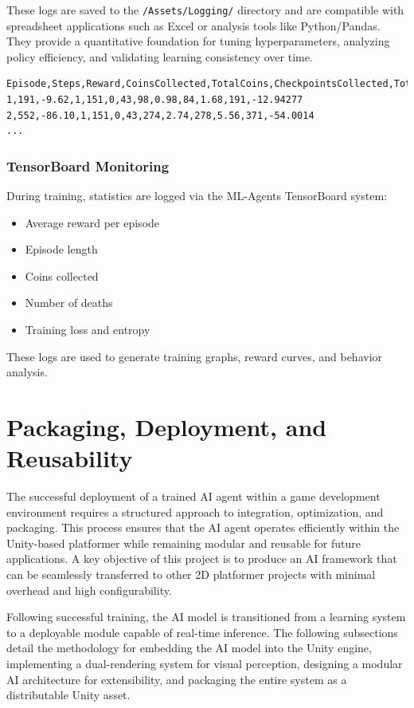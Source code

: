 \documentclass[12pt,oneside,openright,a4paper]{cpe-english-project}
\begin{document}
These logs are saved to the \texttt{/Assets/Logging/} directory and are compatible with spreadsheet applications such as Excel or analysis tools like Python/Pandas. They provide a quantitative foundation for tuning hyperparameters, analyzing policy efficiency, and validating learning consistency over time.

\begin{lstlisting}
Episode,Steps,Reward,CoinsCollected,TotalCoins,CheckpointsCollected,TotalCheckpoints,JumpCount,JumpPenalty,DashCount,DashPenalty,CumulativeAvgSteps,CumulativeAvgRewards
1,191,-9.62,1,151,0,43,98,0.98,84,1.68,191,-12.94277
2,552,-86.10,1,151,0,43,274,2.74,278,5.56,371,-54.0014
...
\end{lstlisting}

\subsubsection{TensorBoard Monitoring}

During training, statistics are logged via the ML-Agents TensorBoard system:

\begin{itemize}
\item Average reward per episode
\item Episode length
\item Coins collected
\item Number of deaths
\item Training loss and entropy
\end{itemize}

These logs are used to generate training graphs, reward curves, and behavior analysis.

\section{Packaging, Deployment, and Reusability}
The successful deployment of a trained AI agent within a game development environment requires a structured approach to integration, optimization, and packaging. This process ensures that the AI agent operates efficiently within the Unity-based platformer while remaining modular and reusable for future applications. A key objective of this project is to produce an AI framework that can be seamlessly transferred to other 2D platformer projects with minimal overhead and high configurability.\par

Following successful training, the AI model is transitioned from a learning system to a deployable module capable of real-time inference. The following subsections detail the methodology for embedding the AI model into the Unity engine, implementing a dual-rendering system for visual perception, designing a modular AI architecture for extensibility, and packaging the entire system as a distributable Unity asset.\par
\end{document}
